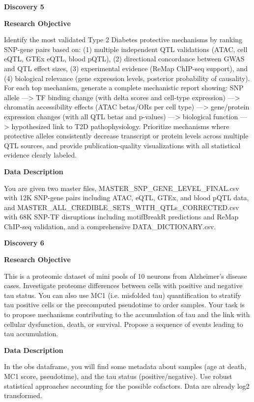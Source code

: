 \documentclass{article}
\begin{document}
\vspace{1em}

\noindent \textbf{Discovery 5} \par
\noindent \textbf{Research Objective} \par
Identify the most validated Type 2 Diabetes protective mechanisms by ranking SNP-gene pairs based on: (1) multiple independent QTL validations (ATAC, cell eQTL, GTEx eQTL, blood pQTL), (2) directional concordance between GWAS and QTL effect sizes, (3) experimental evidence (ReMap ChIP-seq support), and (4) biological relevance (gene expression levels, posterior probability of causality). For each top mechanism, generate a complete mechanistic report showing: SNP allele —> TF binding
change (with delta scores and cell-type expression) —> chromatin accessibility effects (ATAC betas/ORs
per cell type) —> gene/protein expression changes (with all QTL betas and p-values) —> biological function —> hypothesized link to T2D pathophysiology. Prioritize mechanisms where protective alleles consistently decrease transcript or protein levels across multiple QTL sources, and provide publication-quality visualizations with all statistical evidence clearly labeled. \par
\noindent \textbf{Data Description} \par
You are given two master files, MASTER\_SNP\_GENE\_LEVEL\_FINAL.csv with 12K SNP-gene pairs including ATAC, eQTL, GTEx, and blood pQTL data, and MASTER\_ALL\_CREDIBLE\_SETS\_WITH\_QTLs\_CORRECTED.csv with 68K SNP-TF disruptions including motifBreakR predictions and ReMap ChIP-seq validation, and a comprehensive DATA\_DICTIONARY.csv. \par

\vspace{1em}

\noindent \textbf{Discovery 6} \par
\noindent \textbf{Research Objective} \par
This is a proteomic dataset of mini pools of 10 neurons from Alzheimer's disease cases. Investigate proteome differences between cells with positive and negative tau status. You can also use MC1 (i.e. misfolded tau) quantification to stratify tau positive cells or the precomputed pseudotime to order samples.
Your task is to propose mechanisms contributing to the accumulation of tau and the link with cellular dysfunction, death, or survival. Propose a sequence of events leading to tau accumulation. \par
\noindent \textbf{Data Description} \par
In the obs dataframe, you will find some metadata about samples (age at death, MC1 score, pseudotime), and the tau status (positive/negative). Use robust statistical approaches accounting for the possible cofactors. Data are already log2 transformed. \par
\end{document}
